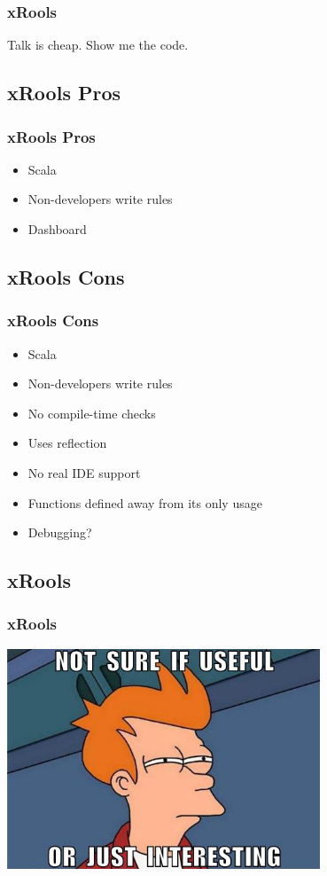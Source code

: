 \documentclass[14pt]{beamer}
\begin{document}
\frame
{\frametitle{xRools}
\begin{center}
  \large Talk is cheap. Show me the code.
\end{center}
}

\subsection{xRools Pros}
\frame
{\frametitle{xRools Pros}
\begin{itemize}
    \item<1> Scala
    \item<1> Non-developers write rules
    \item<1> Dashboard 
\end{itemize}
}

\subsection{xRools Cons}
\frame
{\frametitle{xRools Cons}
\begin{itemize}
    \item<1> Scala
    \item<1> Non-developers write rules
    \item<1> No compile-time checks
    \item<1> Uses reflection
    \item<1> No real IDE support
    \item<1> Functions defined away from its only usage
    \item<1> Debugging?
\end{itemize}
}

\subsection{xRools}
\frame
{\frametitle{xRools}
  \begin{center}
    \includegraphics[width=0.7\textwidth]{xrools.jpeg}
  \end{center}
}
\end{document}
